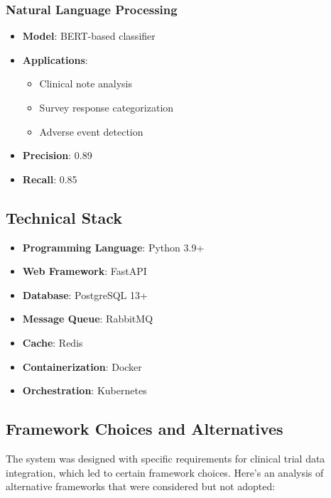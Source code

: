 \documentclass[12pt]{article}
\begin{document}
\subsubsection{Natural Language Processing}
\begin{itemize}
    \item \textbf{Model}: BERT-based classifier
    \item \textbf{Applications}:
    \begin{itemize}
        \item Clinical note analysis
        \item Survey response categorization
        \item Adverse event detection
    \end{itemize}
    \item \textbf{Precision}: 0.89
    \item \textbf{Recall}: 0.85
\end{itemize}

\subsection{Technical Stack}
\begin{itemize}
    \item \textbf{Programming Language}: Python 3.9+
    \item \textbf{Web Framework}: FastAPI
    \item \textbf{Database}: PostgreSQL 13+
    \item \textbf{Message Queue}: RabbitMQ
    \item \textbf{Cache}: Redis
    \item \textbf{Containerization}: Docker
    \item \textbf{Orchestration}: Kubernetes
\end{itemize}

\subsection{Framework Choices and Alternatives}
The system was designed with specific requirements for clinical trial data integration, which led to certain framework choices. Here's an analysis of alternative frameworks that were considered but not adopted:
\end{document}
